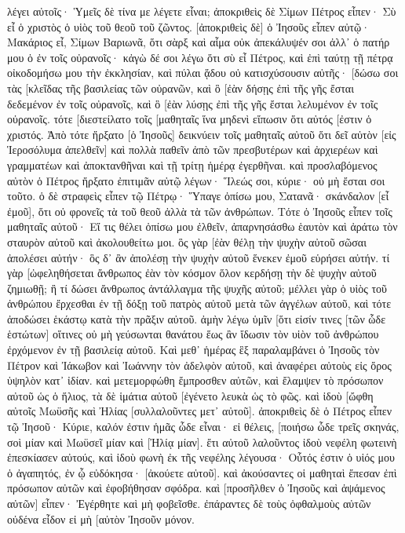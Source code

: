 λέγει αὐτοῖς· Ὑμεῖς δὲ τίνα με λέγετε εἶναι; 
ἀποκριθεὶς δὲ Σίμων Πέτρος εἶπεν· Σὺ εἶ ὁ χριστὸς ὁ υἱὸς τοῦ θεοῦ τοῦ ζῶντος. 
[ἀποκριθεὶς δὲ] ὁ Ἰησοῦς εἶπεν αὐτῷ· Μακάριος εἶ, Σίμων Βαριωνᾶ, ὅτι σὰρξ καὶ αἷμα οὐκ ἀπεκάλυψέν σοι ἀλλ᾽ ὁ πατήρ μου ὁ ἐν τοῖς οὐρανοῖς· 
κἀγὼ δέ σοι λέγω ὅτι σὺ εἶ Πέτρος, καὶ ἐπὶ ταύτῃ τῇ πέτρᾳ οἰκοδομήσω μου τὴν ἐκκλησίαν, καὶ πύλαι ᾅδου οὐ κατισχύσουσιν αὐτῆς· 
[δώσω σοι τὰς [κλεῖδας τῆς βασιλείας τῶν οὐρανῶν, καὶ ὃ [ἐὰν δήσῃς ἐπὶ τῆς γῆς ἔσται δεδεμένον ἐν τοῖς οὐρανοῖς, καὶ ὃ [ἐὰν λύσῃς ἐπὶ τῆς γῆς ἔσται λελυμένον ἐν τοῖς οὐρανοῖς. 
τότε [διεστείλατο τοῖς [μαθηταῖς ἵνα μηδενὶ εἴπωσιν ὅτι αὐτός [ἐστιν ὁ χριστός. 
Ἀπὸ τότε ἤρξατο [ὁ Ἰησοῦς] δεικνύειν τοῖς μαθηταῖς αὐτοῦ ὅτι δεῖ αὐτὸν [εἰς Ἱεροσόλυμα ἀπελθεῖν] καὶ πολλὰ παθεῖν ἀπὸ τῶν πρεσβυτέρων καὶ ἀρχιερέων καὶ γραμματέων καὶ ἀποκτανθῆναι καὶ τῇ τρίτῃ ἡμέρᾳ ἐγερθῆναι. 
καὶ προσλαβόμενος αὐτὸν ὁ Πέτρος ἤρξατο ἐπιτιμᾶν αὐτῷ λέγων· Ἵλεώς σοι, κύριε· οὐ μὴ ἔσται σοι τοῦτο. 
ὁ δὲ στραφεὶς εἶπεν τῷ Πέτρῳ· Ὕπαγε ὀπίσω μου, Σατανᾶ· σκάνδαλον [εἶ ἐμοῦ], ὅτι οὐ φρονεῖς τὰ τοῦ θεοῦ ἀλλὰ τὰ τῶν ἀνθρώπων. 
Τότε ὁ Ἰησοῦς εἶπεν τοῖς μαθηταῖς αὐτοῦ· Εἴ τις θέλει ὀπίσω μου ἐλθεῖν, ἀπαρνησάσθω ἑαυτὸν καὶ ἀράτω τὸν σταυρὸν αὐτοῦ καὶ ἀκολουθείτω μοι. 
ὃς γὰρ [ἐὰν θέλῃ τὴν ψυχὴν αὐτοῦ σῶσαι ἀπολέσει αὐτήν· ὃς δ᾽ ἂν ἀπολέσῃ τὴν ψυχὴν αὐτοῦ ἕνεκεν ἐμοῦ εὑρήσει αὐτήν. 
τί γὰρ [ὠφεληθήσεται ἄνθρωπος ἐὰν τὸν κόσμον ὅλον κερδήσῃ τὴν δὲ ψυχὴν αὐτοῦ ζημιωθῇ; ἢ τί δώσει ἄνθρωπος ἀντάλλαγμα τῆς ψυχῆς αὐτοῦ; 
μέλλει γὰρ ὁ υἱὸς τοῦ ἀνθρώπου ἔρχεσθαι ἐν τῇ δόξῃ τοῦ πατρὸς αὐτοῦ μετὰ τῶν ἀγγέλων αὐτοῦ, καὶ τότε ἀποδώσει ἑκάστῳ κατὰ τὴν πρᾶξιν αὐτοῦ. 
ἀμὴν λέγω ὑμῖν [ὅτι εἰσίν τινες [τῶν ὧδε ἑστώτων] οἵτινες οὐ μὴ γεύσωνται θανάτου ἕως ἂν ἴδωσιν τὸν υἱὸν τοῦ ἀνθρώπου ἐρχόμενον ἐν τῇ βασιλείᾳ αὐτοῦ. 
Καὶ μεθ᾽ ἡμέρας ἓξ παραλαμβάνει ὁ Ἰησοῦς τὸν Πέτρον καὶ Ἰάκωβον καὶ Ἰωάννην τὸν ἀδελφὸν αὐτοῦ, καὶ ἀναφέρει αὐτοὺς εἰς ὄρος ὑψηλὸν κατ᾽ ἰδίαν. 
καὶ μετεμορφώθη ἔμπροσθεν αὐτῶν, καὶ ἔλαμψεν τὸ πρόσωπον αὐτοῦ ὡς ὁ ἥλιος, τὰ δὲ ἱμάτια αὐτοῦ [ἐγένετο λευκὰ ὡς τὸ φῶς. 
καὶ ἰδοὺ [ὤφθη αὐτοῖς Μωϋσῆς καὶ Ἠλίας [συλλαλοῦντες μετ᾽ αὐτοῦ]. 
ἀποκριθεὶς δὲ ὁ Πέτρος εἶπεν τῷ Ἰησοῦ· Κύριε, καλόν ἐστιν ἡμᾶς ὧδε εἶναι· εἰ θέλεις, [ποιήσω ὧδε τρεῖς σκηνάς, σοὶ μίαν καὶ Μωϋσεῖ μίαν καὶ [Ἠλίᾳ μίαν]. 
ἔτι αὐτοῦ λαλοῦντος ἰδοὺ νεφέλη φωτεινὴ ἐπεσκίασεν αὐτούς, καὶ ἰδοὺ φωνὴ ἐκ τῆς νεφέλης λέγουσα· Οὗτός ἐστιν ὁ υἱός μου ὁ ἀγαπητός, ἐν ᾧ εὐδόκησα· [ἀκούετε αὐτοῦ]. 
καὶ ἀκούσαντες οἱ μαθηταὶ ἔπεσαν ἐπὶ πρόσωπον αὐτῶν καὶ ἐφοβήθησαν σφόδρα. 
καὶ [προσῆλθεν ὁ Ἰησοῦς καὶ ἁψάμενος αὐτῶν] εἶπεν· Ἐγέρθητε καὶ μὴ φοβεῖσθε. 
ἐπάραντες δὲ τοὺς ὀφθαλμοὺς αὐτῶν οὐδένα εἶδον εἰ μὴ [αὐτὸν Ἰησοῦν μόνον. 
